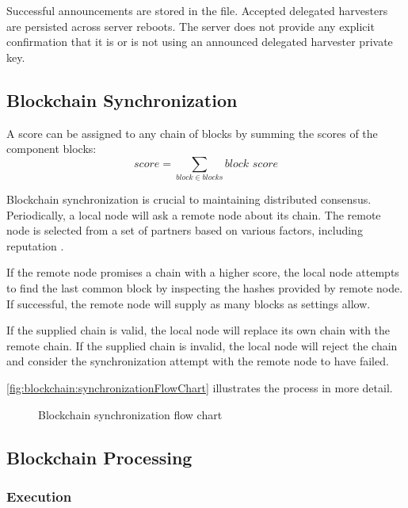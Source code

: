 Successful announcements are stored in the  file.
Accepted delegated harvesters are persisted across server reboots.
The server does not provide any explicit confirmation that it is or is not using an announced delegated harvester private key.

\subsection{Blockchain Synchronization}
\label{sec:blockchain:sync}

A score can be assigned to any chain of blocks by summing the scores of the component blocks:
\begin{equation}
\tag{blockchain score} \mathit{score} = \sum_{\mathit{block} \in \mathit{blocks}} \textit{block score}
\end{equation}

Blockchain synchronization is crucial to maintaining distributed consensus.
Periodically, a local node will ask a remote node about its chain.
The remote node is selected from a set of partners based on various factors, including reputation .

If the remote node promises a chain with a higher score, the local node attempts to find the last common block by inspecting the hashes provided by remote node.
If successful, the remote node will supply as many blocks as settings allow.

If the supplied chain is valid, the local node will replace its own chain with the remote chain.
If the supplied chain is invalid, the local node will reject the chain and consider the synchronization attempt with the remote node to have failed.

\autoref{fig:blockchain:synchronizationFlowChart} illustrates the process in more detail.

\begin{figure}[H]
	\begin{center}
		
		\caption{Blockchain synchronization flow chart\label{fig:blockchain:synchronizationFlowChart}}
	\end{center}
\end{figure}

\subsection{Blockchain Processing}

\subsubsection*{Execution}

